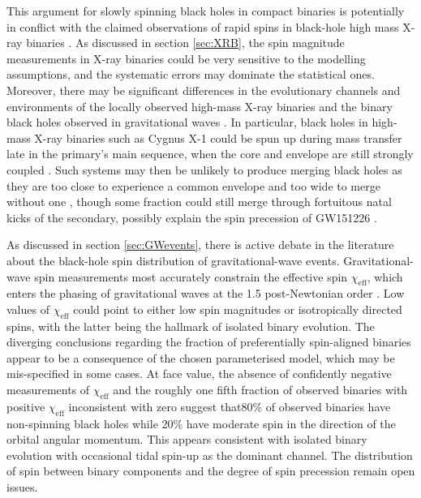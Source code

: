 \documentclass[review]{elsarticle}
\begin{document}
This argument for slowly spinning black holes in compact binaries is potentially in conflict with the claimed observations of rapid spins in black-hole high mass X-ray binaries \citep{MillerMiller:2015}.     As discussed in section \ref{sec:XRB}, the spin magnitude measurements in X-ray binaries could be very sensitive to the modelling assumptions, and the systematic errors may dominate the statistical ones. Moreover, there may be significant differences in the evolutionary channels and environments of the locally observed high-mass X-ray binaries and the binary black holes observed in gravitational waves \citep[][and see section \ref{environ}]{HotokezakaPiran:2017}.  In particular, black holes in high-mass X-ray binaries such as Cygnus X-1 could be spun up during mass transfer late in the primary's main sequence, when the core and envelope are still strongly coupled \citep{Qin:2018}.  Such systems may then be unlikely to produce merging black holes as they are too close to experience a common envelope and too wide to merge without one \citep{Neijssel:2020CygX1}, though some fraction could still merge through fortuitous natal kicks of the secondary, possibly explain the spin precession of GW151226 \citep[][but see \cite{GW151226,MateuLucena:2021}]{Chia:2021}.

As discussed in section \ref{sec:GWevents}, there is active debate in the literature about the black-hole spin distribution of gravitational-wave events.  Gravitational-wave spin measurements most accurately constrain the effective spin $\chi_\mathrm{eff}$, which enters the phasing of gravitational waves at the 1.5 post-Newtonian order \citep{PoissonWill:1995}.  Low values of $\chi_\mathrm{eff}$ could point to either low spin magnitudes or isotropically directed spins, with the latter being the hallmark of isolated binary evolution.  The diverging conclusions regarding the fraction of preferentially spin-aligned binaries  \citep{GWTC2:pop,Roulet:2021,Callister:2021,Galaudage:2021} appear to be a consequence of the chosen parameterised model, which may be mis-specified in some cases.  At face value, the absence of confidently negative measurements of $\chi_\mathrm{eff}$ and the roughly one fifth fraction of observed binaries with positive $\chi_\mathrm{eff}$ inconsistent with zero suggest that80\% of observed binaries have non-spinning black holes while 20\% have moderate spin in the direction of the orbital angular momentum.  This appears consistent with isolated binary evolution with occasional tidal spin-up as the dominant channel.  The distribution of spin between binary components and the degree of spin precession remain open issues. 
\end{document}
